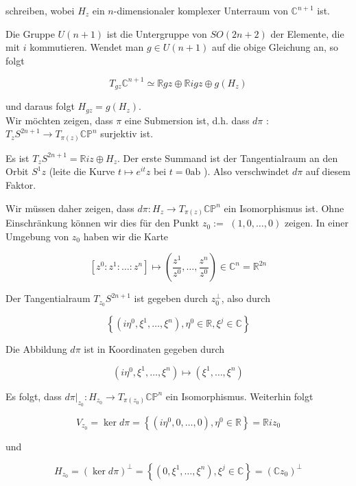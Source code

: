 \documentclass[10pt]{article}
\begin{document}
schreiben, wobei $H_{z}$ ein $n$-dimensionaler komplexer Unterraum von $\mathbb{C}^{n+1}$ ist.

Die Gruppe $U(n+1)$ ist die Untergruppe von $S O(2 n+2)$ der Elemente, die mit $i$ kommutieren. Wendet man $g \in U(n+1)$ auf die obige Gleichung an, so folgt

$$
T_{g z} \mathbb{C}^{n+1} \simeq \mathbb{R} g z \oplus \mathbb{R} i g z \oplus g\left(H_{z}\right)
$$

und daraus folgt $H_{g z}=g\left(H_{z}\right)$.\\
Wir möchten zeigen, dass $\pi$ eine Submersion ist, d.h. dass $d \pi$ : $T_{z} S^{2 n+1} \rightarrow T_{\pi(z)} \mathbb{C P}^{n}$ surjektiv ist.

Es ist $T_{z} S^{2 n+1}=\mathbb{R} i z \oplus H_{z}$. Der erste Summand ist der Tangentialraum an den Orbit $S^{1} z$ (leite die Kurve $t \mapsto e^{i t} z$ bei $t=0 \mathrm{ab}$ ). Also verschwindet $d \pi$ auf diesem Faktor.

Wir müssen daher zeigen, dass $d \pi: H_{z} \rightarrow T_{\pi(z)} \mathbb{C P}^{n}$ ein Isomorphismus ist. Ohne Einschränkung können wir dies für den Punkt $z_{0}:=$ $(1,0, \ldots, 0)$ zeigen. In einer Umgebung von $z_{0}$ haben wir die Karte

$$
\left[z^{0}: z^{1}: \ldots: z^{n}\right] \mapsto\left(\frac{z^{1}}{z^{0}}, \ldots, \frac{z^{n}}{z^{0}}\right) \in \mathbb{C}^{n}=\mathbb{R}^{2 n}
$$

Der Tangentialraum $T_{z_{0}} S^{2 n+1}$ ist gegeben durch $z_{0}^{\perp}$, also durch

$$
\left\{\left(i \eta^{0}, \xi^{1}, \ldots, \xi^{n}\right), \eta^{0} \in \mathbb{R}, \xi^{j} \in \mathbb{C}\right\}
$$

Die Abbildung $d \pi$ ist in Koordinaten gegeben durch

$$
\left(i \eta^{0}, \xi^{1}, \ldots, \xi^{n}\right) \mapsto\left(\xi^{1}, \ldots, \xi^{n}\right)
$$

Es folgt, dass $\left.d \pi\right|_{z_{0}}: H_{z_{0}} \rightarrow T_{\pi\left(z_{0}\right)} \mathbb{C} \mathbb{P}^{n}$ ein Isomorphismus. Weiterhin folgt

$$
V_{z_{0}}=\operatorname{ker} d \pi=\left\{\left(i \eta^{0}, 0, \ldots, 0\right), \eta^{0} \in \mathbb{R}\right\}=\mathbb{R} i z_{0}
$$

und

$$
H_{z_{0}}=(\operatorname{ker} d \pi)^{\perp}=\left\{\left(0, \xi^{1}, \ldots, \xi^{n}\right), \xi^{j} \in \mathbb{C}\right\}=\left(\mathbb{C} z_{0}\right)^{\perp}
$$
\end{document}
